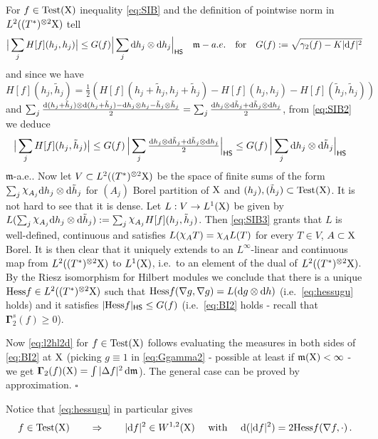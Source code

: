 \documentclass[11pt]{article}
\numberwithin{equation}{section}
\newenvironment{idea}{\removelastskip\par\medskip   %
\noindent{\em Idea of the proof} \rm}{\penalty-20\null\hfill$\square$\par\medbreak}
\newcommand{\X}{{\rm X}}
\newcommand{\mm}{{\mathfrak m}}
\renewcommand{\d}{{\rm d}}
\newcommand{\nchi}{{\raise.3ex\hbox{$\chi$}}}
\newcommand{\HS}{\sf HS}
\newcommand{\test}{{\rm Test}}
\newcommand{\Ggamma}{{\mathbf \Gamma}}
\begin{document}
\begin{idea} For $f\in\test(\X)$ inequality \eqref{eq:SIB} and the definition of pointwise norm in $L^2((T^*)^{\otimes 2}\X)$ tell
\begin{equation}
\label{eq:SIB2}
\big|\sum_jH[f](h_j,h_j)\big|\leq G(f)\Big|\sum_j\d h_j\otimes \d h_{j}\Big|_{\HS}\quad\mm-a.e.\quad\text{for}\quad G(f):=\sqrt{\gamma_2(f)-K|\d f|^2}\,
\end{equation}
and since we  have $ H[f](h_j,\tilde h_j)=\tfrac12( H[f](h_j+\tilde h_j,h_j+\tilde h_j)-H[f](h_j, h_j)-H[f](\tilde h_j,\tilde h_j))
$
and $\sum_j\frac{\d(h_j+\tilde h_j)\otimes\d(h_j+\tilde h_j)-\d h_j\otimes h_j-\tilde h_j\otimes \tilde h_j}2=\sum_j \tfrac{\d h_j\otimes \d \tilde h_{j}+\d\tilde h_j\otimes \d  h_{j}}2$, from \eqref{eq:SIB2} we deduce
\begin{equation}
\label{eq:SIB3}
\begin{split}
\big|\sum_jH[f](h_j,\tilde h_j)\big|&\leq  G(f)\,\Big|\sum_j\tfrac{\d h_j\otimes \d \tilde h_{j}+\d\tilde h_j\otimes \d  h_{j}}2\Big|_{\HS}\leq G(f)\,\Big|\sum_j\d h_j\otimes \d \tilde h_{j}\Big|_{\HS}%
\end{split}
\end{equation}
$\mm$-a.e.. Now let $V\subset L^2((T^*)^{\otimes 2}\X)$ be the space of finite sums of the form $\sum_j\nchi_{A_j}\d h_j\otimes\d \tilde h_j$ for $(A_j)$ Borel partition of $\X$ and $(h_j),(\tilde h_j)\subset\test(\X)$. It is not hard to see that it is dense. Let $L:V\to L^1(\X)$ be given by $L(\sum_j\nchi_{A_j}\d h_j\otimes\d \tilde h_j):=\sum_j\nchi_{A_j}H[f](h_j,\tilde h_j)$. Then \eqref{eq:SIB3} grants that $L$  is well-defined, continuous and satisfies $L(\nchi_AT)=\nchi_AL(T)$ for every $T\in V$, $A\subset\X$ Borel. It is then clear that it uniquely extends to an $L^\infty$-linear and continuous map from $L^2((T^*)^{\otimes 2}\X)$ to $L^1(\X)$, i.e.\ to an element of the dual of $L^2((T^*)^{\otimes 2}\X)$. By the  Riesz isomorphism for Hilbert modules we conclude that there is a unique ${\rm Hess }f\in L^2((T^*)^{\otimes 2}\X)$ such that ${\rm Hess}f(\nabla g,\nabla g)=L(\d g\otimes\d h)$ (i.e.\ \eqref{eq:hessugu} holds) and it satisfies $|{\rm Hess} f|_{\HS}\leq G(f)$ (i.e.\ \eqref{eq:BI2} holds - recall that $\Ggamma_2^s(f)\geq 0$).

Now \eqref{eq:l2hl2d} for $f\in\test(\X)$ follows evaluating the measures in both sides of \eqref{eq:BI2} at $\X$ (picking $g\equiv1$ in \eqref{eq:Ggamma2} - possible at least if $\mm(\X)<\infty$  - we get $\Ggamma_2(f)(\X)=\int|\Delta f|^2\,\d\mm$). The general case can be proved by approximation.
\end{idea}
Notice that \eqref{eq:hessugu} in particular gives
\begin{equation}
\label{eq:dgrad}
f\in\test(\X)\qquad\Rightarrow\qquad |\d f|^2\in W^{1,2}(\X)\quad\text{ with }\quad\d(|\d f|^2)=2{\rm Hess}f(\nabla f,\cdot)\,.
\end{equation}
\end{document}
